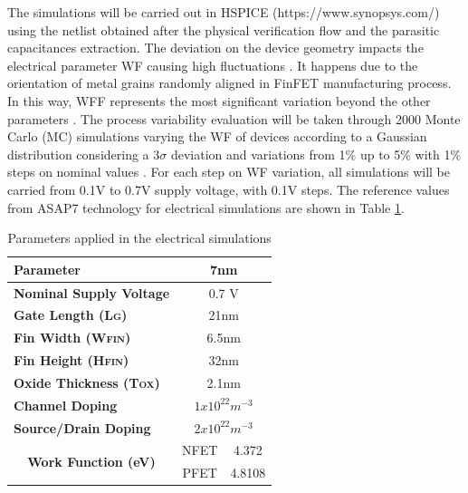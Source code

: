 \documentclass[pgmicro,mestrado,english]{iiufrgs}
\begin{document}
The simulations will be carried out in HSPICE (https://www.synopsys.com/) using the netlist obtained after the physical verification flow and the parasitic capacitances extraction. The deviation on the device geometry impacts the electrical parameter WF causing high fluctuations \cite{zimpeck2016finfet}. It happens due to the orientation of metal grains randomly aligned in FinFET manufacturing process. In this way, WFF represents the most significant variation beyond the other parameters \cite{meinhardt2014impact}. The process variability evaluation will be taken through 2000 Monte Carlo (MC) simulations \cite{alioto2015variations} varying the WF of devices according to a Gaussian distribution considering a 3\(\sigma\) deviation and variations from 1\% up to 5\% with 1\% steps on nominal values \cite{nawaz2014comparison}. For each step on WF variation, all simulations will be carried from 0.1V to 0.7V supply voltage, with 0.1V steps. The reference values from ASAP7 technology for electrical simulations are shown in Table \ref{electPar}.

\begin{table}[H]
\centering
\caption{Parameters applied in the electrical simulations}
\label{electPar}
\begin{tabular}{lcc}
\hline
\textbf{Parameter}                                            & \multicolumn{2}{c}{\textbf{7nm}}                                  \\ \hline
\textbf{Nominal Supply Voltage}                               & \multicolumn{2}{c}{0.7 V}                                         \\ \hline
\textbf{Gate Length (L\textsc{g})}           & \multicolumn{2}{c}{21nm}                                          \\ \hline
\textbf{Fin Width (W\textsc{fin})}              & \multicolumn{2}{c}{6.5nm}                                         \\ \hline
\textbf{Fin Height (H\textsc{fin})}          & \multicolumn{2}{c}{32nm}                                          \\ \hline
\textbf{Oxide Thickness (T\textsc{ox})}      & \multicolumn{2}{c}{2.1nm}                                         \\ \hline
\textbf{Channel Doping}                                       & \multicolumn{2}{c}{$1x10^{22}m^{-3}$}                                     \\ \hline
\textbf{Source/Drain Doping}                                  & \multicolumn{2}{c}{$2x10^{22}m^{-3}$} \\ \hline
\multicolumn{1}{c}{\multirow{2}{*}{\textbf{Work Function (eV)}}} & NFET                            & 4.372                            \\ \cline{2-3}
\multicolumn{1}{c}{}                                        & PFET                            & 4.8108                           \\ \hline
\end{tabular}
\end{table}
\end{document}
